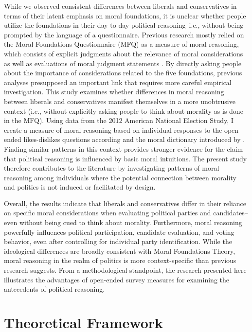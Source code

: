 \documentclass[12pt]{article}
\begin{document}
While we observed consistent differences between liberals and conservatives in terms of their latent emphasis on moral foundations, it is unclear whether people utilize the foundations in their day-to-day political reasoning--i.e., without being prompted by the language of a questionnaire. Previous research mostly relied on the Moral Foundations Questionnaire (MFQ) as a measure of moral reasoning, which consists of explicit judgments about the relevance of moral considerations as well as evaluations of moral judgment statements \citep[e.g.][]{graham2011mapping}. By directly asking people about the importance of considerations related to the five foundations, previous analyses presupposed an important link that requires more careful empirical investigation. This study examines whether differences in moral reasoning between liberals and conservatives manifest themselves in a more unobtrusive context (i.e., without explicitly asking people to think about morality as is done in the MFQ). Using data from the 2012 American National Election Study, I create a measure of moral reasoning based on individual responses to the open-ended likes-dislikes questions according and the moral dictionary introduced by \citet{graham2009liberals}. Finding similar patterns in this context provides stronger evidence for the claim that political reasoning is influenced by basic moral intuitions. The present study therefore contributes to the literature by investigating patterns of moral reasoning among individuals where the potential connection between morality and politics is not induced or facilitated by design.

Overall, the results indicate that liberals and conservatives differ in their reliance on specific moral considerations when evaluating political parties and candidates--even without being cued to think about morality. Furthermore, moral reasoning powerfully influences political participation, candidate evaluation, and voting behavior, even after controlling for individual party identification. While the ideological differences are broadly consistent with Moral Foundations Theory, moral reasoning in the realm of politics is more context-specific than previous research suggests. From a methodological standpoint, the research presented here illustrates the advantages of open-ended survey measures for examining the antecedents of political reasoning.


\section{Theoretical Framework}
\end{document}
